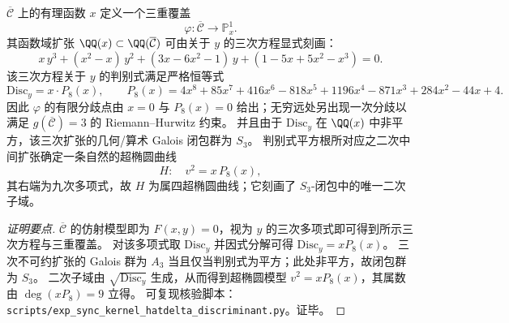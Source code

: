 \begin{proposition}\label{prop:sync-hatdelta-quotient-triple-cover-s3-discriminant}
\(\overline{\mathcal{C}}\) 上的有理函数 \(x\) 定义一个三重覆盖
\[
\varphi:\overline{\mathcal{C}}\longrightarrow\mathbb{P}^1_x.
\]
其函数域扩张 \(\QQ(x)\subset\QQ(\overline{\mathcal{C}})\) 可由关于 \(y\) 的三次方程显式刻画：
\[
x\,y^3+(x^2-x)\,y^2+(3x-6x^2-1)\,y+(1-5x+5x^2-x^3)=0.
\]
该三次方程关于 \(y\) 的判别式满足严格恒等式
\[
\mathrm{Disc}_y=x\cdot P_8(x),
\qquad
P_8(x)=4x^8+85x^7+416x^6-818x^5+1196x^4-871x^3+284x^2-44x+4.
\]
因此 \(\varphi\) 的有限分歧点由 \(x=0\) 与 \(P_8(x)=0\) 给出；无穷远处另出现一次分歧以满足 \(g(\overline{\mathcal{C}})=3\) 的 Riemann--Hurwitz 约束。
并且由于 \(\mathrm{Disc}_y\) 在 \(\QQ(x)\) 中非平方，该三次扩张的几何/算术 Galois 闭包群为 \(S_3\)。
判别式平方根所对应之二次中间扩张确定一条自然的超椭圆曲线
\[
H:\quad v^2=x\,P_8(x),
\]
其右端为九次多项式，故 \(H\) 为属四超椭圆曲线；它刻画了 \(S_3\)-闭包中的唯一二次子域。
\end{proposition}
\begin{proof}[证明要点]
\(\overline{\mathcal{C}}\) 的仿射模型即为 \(F(x,y)=0\)，视为 \(y\) 的三次多项式即可得到所示三次方程与三重覆盖。
对该多项式取 \(\mathrm{Disc}_y\) 并因式分解可得 \(\mathrm{Disc}_y=xP_8(x)\)。
三次不可约扩张的 Galois 群为 \(A_3\) 当且仅当判别式为平方；此处非平方，故闭包群为 \(S_3\)。
二次子域由 \(\sqrt{\mathrm{Disc}_y}\) 生成，从而得到超椭圆模型 \(v^2=xP_8(x)\)，其属数由 \(\deg(xP_8)=9\) 立得。
可复现核验脚本：\texttt{scripts/exp\_sync\_kernel\_hatdelta\_discriminant.py}。证毕。
\end{proof}

